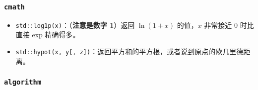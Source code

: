 \subsubsection[cmath]{\texttt{cmath}}

\begin{itemize}
	\item \texttt{std::log1p(x)}：（\textbf{注意是数字 1}）返回 $\ln(1 + x)$ 的值，$x$ 非常接近 $0$ 时比直接 exp 精确得多。
	\item \texttt{std::hypot(x, y[, z])}：返回平方和的平方根，或者说到原点的欧几里德距离。
\end{itemize}

\subsubsection[algorithm]{\texttt{algorithm}}


